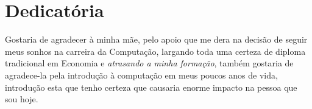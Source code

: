 \documentclass[conference]{IEEEtran}
\begin{document}


 \section*{Dedicatória}
 	Gostaria de agradecer à minha mãe, pelo apoio que me dera na decisão de seguir meus sonhos na carreira da Computação, largando toda uma certeza de diploma tradicional em Economia e \emph{atrasando a minha formação}, também gostaria de agradece-la pela introdução à computação em meus poucos anos de vida, introdução esta que tenho certeza que causaria enorme impacto na pessoa que sou hoje.








%
%
%
\end{document}
